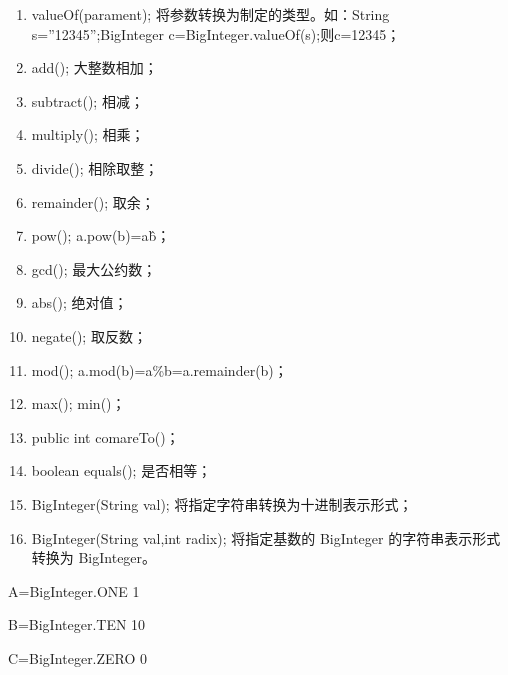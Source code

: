 \begin{enumerate}
	\item valueOf(parament); 将参数转换为制定的类型。如：String s=”12345”;BigInteger c=BigInteger.valueOf(s);则c=12345；
	\item add(); 大整数相加；
	\item subtract(); 相减；
	\item multiply(); 相乘；
	\item divide(); 相除取整；
	\item remainder(); 取余；
	\item pow();   a.pow(b)=a\^b；
	\item gcd();   最大公约数；
	\item abs(); 绝对值；
	\item negate(); 取反数；
	\item mod(); a.mod(b)=a\%b=a.remainder(b)；
	\item max(); min()；
	\item public int comareTo()；
	\item boolean equals(); 是否相等；
	\item BigInteger(String val); 将指定字符串转换为十进制表示形式；
	\item BigInteger(String val,int radix); 将指定基数的 BigInteger 的字符串表示形式转换为 BigInteger。
\end{enumerate}
A=BigInteger.ONE    1\par
B=BigInteger.TEN    10\par
C=BigInteger.ZERO   0